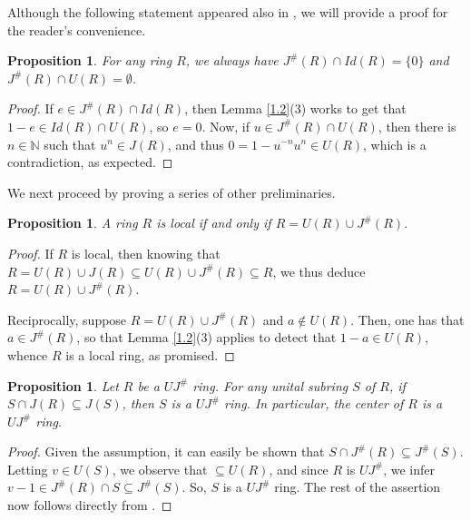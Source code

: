 \documentclass[12pt]{amsart}
\newtheorem{proposition}[theorem]{Proposition}
\theoremstyle{definition}
\begin{document}
Although the following statement appeared also in \cite{SU}, we will provide a proof for the reader's convenience.

\begin{proposition}\label{3.8}
For any ring $R$, we always have \( J^\#(R) \cap Id(R) = \{0\} \) and \( J^\#(R) \cap U(R) = \emptyset \).
\end{proposition}

\begin{proof}
If \( e \in J^\#(R) \cap Id(R) \), then Lemma \ref{1.2}(3) works to get that \( 1-e \in Id(R) \cap U(R) \), so \( e=0 \). Now, if \( u \in J^\#(R) \cap U(R) \), then there is \( n \in \mathbb{N} \) such that \( u^n \in J(R) \), and thus \( 0=1-u^{-n}u^n \in U(R) \), which is a contradiction, as expected.
\end{proof}

We next proceed by proving a series of other preliminaries.

\begin{proposition}\label{3.7}
A ring \( R \) is local if and only if \( R=U(R) \cup J^\#(R) \).
\end{proposition}

\begin{proof}
If \( R \) is local, then knowing that \( R=U(R) \cup J(R) \subseteq U(R) \cup J^\#(R) \subseteq R \), we thus deduce \( R=U(R) \cup J^\#(R) \).

Reciprocally, suppose \( R=U(R) \cup J^\#(R) \) and \( a \not\in U(R) \). Then, one has that \( a \in J^\#(R) \), so that Lemma \ref{1.2}(3) applies to detect that \( 1-a \in U(R) \), whence \( R \) is a local ring, as promised.	
\end{proof}

\begin{proposition}\label{3.4}
Let \(R\) be a $UJ^{\#}$ ring. For any unital subring \(S\) of \(R\), if \(S \cap J(R) \subseteq J(S)\), then \(S\) is a $UJ^{\#}$ ring. In particular, the center of \(R\) is a $UJ^{\#}$ ring.
\end{proposition}

\begin{proof}
Given the assumption, it can easily be shown that \(S \cap J^{\#}(R) \subseteq J^{\#}(S)\). Letting $v\in U(S)$, we observe that $\subseteq U(R)$, and since $R$ is $UJ^{\#}$, we infer $v-1\in J^{\#}(R)\cap S\subseteq J^{\#}(S)$. So, $S$ is a $UJ^{\#}$ ring. The rest of the assertion now follows directly from \cite[Ex.5.0]{lam}.
\end{proof}
\end{document}

